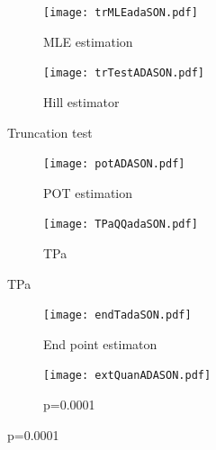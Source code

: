 \documentclass{article}
\begin{document}
	\begin{figure}[H]
		\centering
		\begin{subfigure}{0.5\textwidth}
			\texttt{[image: trMLEadaSON.pdf]}
			\caption{MLE estimation}
		\end{subfigure}%
		\begin{subfigure}{0.5\textwidth}
			\texttt{[image: trTestADASON.pdf]}
			\caption{Hill estimator}
		\end{subfigure}
	\caption{Truncation test}
	\end{figure}
	
	\begin{figure}[H]
		\centering
		\begin{subfigure}{0.5\textwidth}
			\texttt{[image: potADASON.pdf]}
			\caption{POT estimation}
		\end{subfigure}%
		\begin{subfigure}{0.5\textwidth}
			\texttt{[image: TPaQQadaSON.pdf]}
			\caption{TPa }
		\end{subfigure}%
	\end{figure}
	
	\begin{figure}[H]
		\centering
		\begin{subfigure}{0.5\textwidth}
			\texttt{[image: endTadaSON.pdf]}
			\caption{End point estimaton}
		\end{subfigure}%
		\begin{subfigure}{0.5\textwidth}
			\texttt{[image: extQuanADASON.pdf]}
			\caption{p=0.0001}
		\end{subfigure}
	\end{figure}
	
\end{document}
